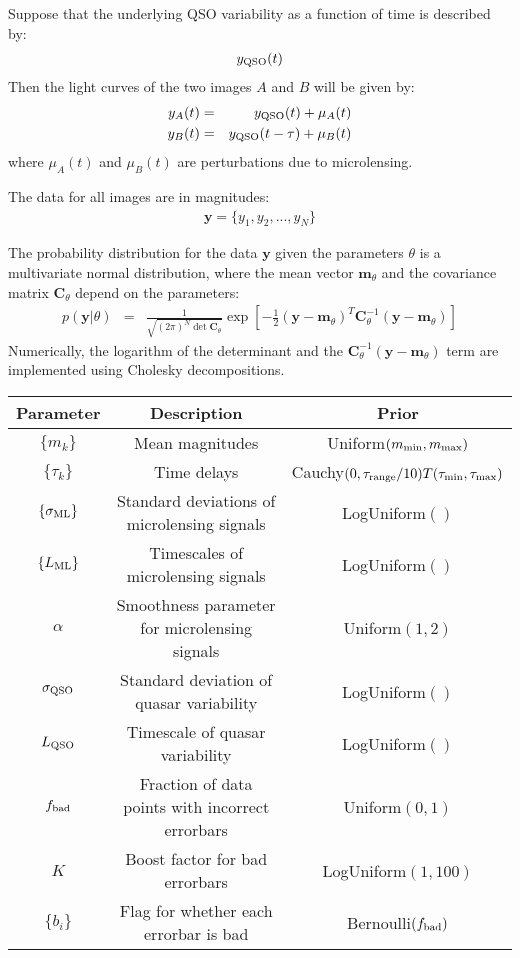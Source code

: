 \documentclass[a4paper, 10pt]{article}
\title{}
\author{}
\date{} %
\newcommand{\yy}{\mathbf{y}}
\newcommand{\mm}{\mathbf{m}_\theta}
\newcommand{\CC}{\mathbf{C}_\theta}
\begin{document}
Suppose that the underlying QSO variability as a function of time is
described by:
\begin{eqnarray}
y_{\rm QSO}(t)
\end{eqnarray}
Then the light curves of the two images $A$ and $B$ will be given by:
\begin{eqnarray}
y_A(t) &=& y_{\rm QSO}(t) + \mu_A(t)\\
y_B(t) &=& y_{\rm QSO}(t - \tau) + \mu_B(t)
\end{eqnarray}
where $\mu_A(t)$ and $\mu_B(t)$ are perturbations due to microlensing.


The data for all images are in magnitudes:
\begin{eqnarray}
\yy = \{y_1, y_2, ..., y_N\}
\end{eqnarray}


The probability distribution for the data $\yy$ given the parameters
$\theta$
is a multivariate normal distribution, where the mean vector $\mm$
and the covariance matrix $\CC$ depend on the parameters:
\begin{eqnarray}
p(\yy | \theta) &=& \frac{1}{\sqrt{(2\pi)^N\det{\CC}}}
\exp\left[
-\frac{1}{2}
\left(
\yy - \mm
\right)^T
\CC^{-1}
\left(
\yy - \mm
\right)
\right]
\end{eqnarray}
Numerically, the logarithm of the determinant and the
$\CC^{-1}\left(\yy - \mm\right)$ term are implemented using
Cholesky decompositions.

\begin{table}[h!]
\begin{center}
\begin{tabular}{|c|c|c|}
\hline
Parameter & Description & Prior\\
\hline
$\{m_k\}$ & Mean magnitudes & Uniform$(m_{\rm min}, m_{\rm max})$\\
$\{\tau_k\}$ & Time delays & Cauchy$(0, \tau_{\rm range}/10)T(\tau_{\rm min}, \tau_{\rm max})$\\
$\{\sigma_{\rm ML}\}$ & Standard deviations of microlensing signals & LogUniform$()$\\
$\{L_{\rm ML}\}$ & Timescales of microlensing signals & LogUniform$()$\\
$\alpha$ & Smoothness parameter for microlensing signals & Uniform$(1,2)$\\
$\sigma_{\rm QSO}$ & Standard deviation of quasar variability & LogUniform$()$\\
$L_{\rm QSO}$ & Timescale of quasar variability & LogUniform$()$\\
$f_{\rm bad}$ & Fraction of data points with incorrect errorbars & Uniform$(0,1)$\\
$K$ & Boost factor for bad errorbars & LogUniform$(1, 100)$\\
$\{b_i\}$ & Flag for whether each errorbar is bad & Bernoulli$(f_{\rm bad})$\\
\hline
\end{tabular}
\end{center}
\end{table}
\end{document}
